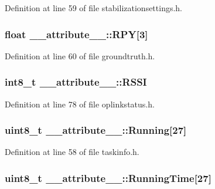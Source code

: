 \-Definition at line 59 of file stabilizationsettings.\-h.

\hypertarget{struct____attribute_____a553b2fa7b8c12434cac736e4fd163505}{
\subsubsection[{\-R\-P\-Y}]{\setlength{\rightskip}{0pt plus 5cm}float {\bf \-\_\-\-\_\-attribute\-\_\-\-\_\-\-::\-R\-P\-Y}\mbox{[}3\mbox{]}}}\label{struct____attribute_____a553b2fa7b8c12434cac736e4fd163505}


\-Definition at line 60 of file groundtruth.\-h.

\hypertarget{struct____attribute_____aab1d35fb1b4b5389ba7d3a8df93174ac}{
\subsubsection[{\-R\-S\-S\-I}]{\setlength{\rightskip}{0pt plus 5cm}int8\-\_\-t {\bf \-\_\-\-\_\-attribute\-\_\-\-\_\-\-::\-R\-S\-S\-I}}}\label{struct____attribute_____aab1d35fb1b4b5389ba7d3a8df93174ac}


\-Definition at line 78 of file oplinkstatus.\-h.

\hypertarget{struct____attribute_____a976c91c5bf7b2228d24c631a50875d0c}{
\subsubsection[{\-Running}]{\setlength{\rightskip}{0pt plus 5cm}uint8\-\_\-t {\bf \-\_\-\-\_\-attribute\-\_\-\-\_\-\-::\-Running}\mbox{[}27\mbox{]}}}\label{struct____attribute_____a976c91c5bf7b2228d24c631a50875d0c}


\-Definition at line 58 of file taskinfo.\-h.

\hypertarget{struct____attribute_____a5dd12f375763cc431ccf00ac40f64502}{
\subsubsection[{\-Running\-Time}]{\setlength{\rightskip}{0pt plus 5cm}uint8\-\_\-t {\bf \-\_\-\-\_\-attribute\-\_\-\-\_\-\-::\-Running\-Time}\mbox{[}27\mbox{]}}}\label{struct____attribute_____a5dd12f375763cc431ccf00ac40f64502}


